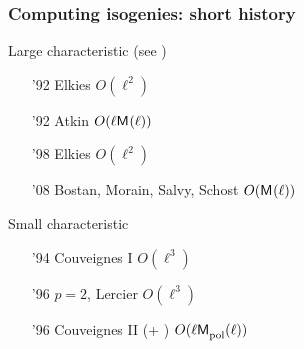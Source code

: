 \documentclass[10pt]{beamer}
\newcommand{\0}{\mathcal{O}}  %
\newcommand{\Mpol}[1][]{\mathrm{\sf M}_\text{pol}^{#1}}  %
\newcommand{\Mult}[1][]{\mathrm{\sf M}_{#1}}  %
\begin{document}

\begin{frame}
  \frametitle{Computing isogenies: short history}
  
  \begin{block}{Large characteristic (see \cite{BoMoSaSc08})}
    \begin{itemize}
    \item['92] Elkies \hfill $O(\ell^2)$
    \item['92] Atkin \hfill $O(\ell\Mult(\ell))$
    \item['98] Elkies \hfill $O(\ell^2)$
    \item['08] Bostan, Morain, Salvy, Schost \hfill $O(\Mult(\ell))$
    \end{itemize}
  \end{block}

  \begin{block}{Small characteristic}
    \begin{itemize}
    \item['94] Couveignes I \hfill $O(\ell^3)$
    \item['96] $p=2$, Lercier \hfill $O(\ell^3)$
    \item['96] Couveignes II (+ \cite{DF07}) \hfill $O(\ell\Mpol(\ell))$
    \end{itemize}
  \end{block}
\end{frame}

\end{document}
